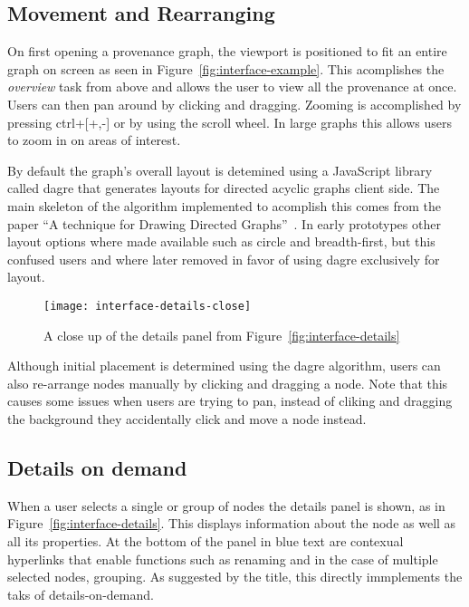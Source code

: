 \subsection{Movement and Rearranging}
\label{sec:movement_and_rearranging}

On first opening a provenance graph, the viewport is positioned to fit an entire graph on screen as seen in Figure~\ref{fig:interface-example}. This acomplishes the \textit{overview} task from above and allows the user to view all the provenance at once. Users can then pan around by clicking and dragging. Zooming is accomplished by pressing ctrl+[+,-] or by using the scroll wheel. In large graphs this allows users to zoom in on areas of interest. 

By default the graph's overall layout is detemined using a JavaScript library called dagre that generates layouts for directed acyclic graphs client side. The main skeleton of the algorithm implemented to acomplish this comes from the paper ``A technique for Drawing Directed Graphs''~\cite{Gansner1993}. In early prototypes other layout options where made available such as circle and breadth-first, but this confused users and where later removed in favor of using dagre exclusively for layout.

\begin{wrapfigure}{r}{0.3\textwidth}
	\centering
	\texttt{[image: interface-details-close]}
	\caption{A close up of the details panel from Figure~\ref{fig:interface-details}}
	\label{fig:key-concepts}
\end{wrapfigure}

Although initial placement is determined using the dagre algorithm, users can also re-arrange nodes manually by clicking and dragging a node. Note that this causes some issues when users are trying to pan, instead of cliking and dragging the background they accidentally click and move a node instead.

\subsection{Details on demand}
\label{sec:details_on_demand}

When a user selects a single or group of nodes the details panel is shown, as in Figure~\ref{fig:interface-details}. This displays information about the node as well as all its properties. At the bottom of the panel in blue text are contexual hyperlinks that enable functions such as renaming and in the case of multiple selected nodes, grouping. As suggested by the title, this directly immplements the taks of details-on-demand.

